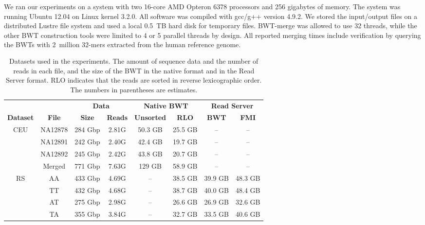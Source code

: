 \documentclass[smallabstract,smallcaptions]{dccpaper}
\newcommand{\BWT}{\textsf{BWT}}
\newcommand{\FMI}{\textsf{FMI}}
\newcommand{\BWTmerge}{\textsf{BWT\nobreakdash-merge}}
\newcommand{\CEU}{\textsf{CEU}}
\newcommand{\RS}{\textsf{RS}}
\begin{document}

We ran our experiments on a system with two 16\nobreakdash-core AMD Opteron 6378 processors and 256 gigabytes of memory. The system was running Ubuntu 12.04 on Linux kernel 3.2.0. All software was compiled with gcc/g++ version 4.9.2. We stored the input/output files on a distributed Lustre file system and used a local 0.5~TB hard disk for temporary files. \BWTmerge{} was allowed to use 32 threads, while the other \BWT{} construction tools were limited to 4 or 5 parallel threads by design. All reported merging times include verification by querying the \BWT{}s with 2~million $32$\nobreakdash-mers extracted from the human reference genome.

\begin{table}[t!]
\begin{center}
\caption{Datasets used in the experiments. The amount of sequence data and the number of reads in each file, and the size of the \BWT{} in the native format and in the Read Server format. RLO indicates that the reads are sorted in reverse lexicographic order. The numbers in parentheses are estimates.}\label{table:datasets}\smallskip%
{
\renewcommand{\baselinestretch}{1}\footnotesize
\begin{tabular}{cc|cc|cc|cc}
\hline
 & & \multicolumn{2}{c|}{\textbf{Data}} & \multicolumn{2}{c|}{\textbf{Native \BWT}} & \multicolumn{2}{c}{\textbf{Read Server}} \\
\textbf{Dataset} & \textbf{File} & \textbf{Size} & \textbf{Reads} & \textbf{Unsorted} & \textbf{RLO} & \textbf{\BWT} & \textbf{\FMI} \\
\hline
\CEU & NA12878 &  284 Gbp & 2.81G & 50.3 GB & 25.5 GB &      -- &       -- \\
     & NA12891 &  242 Gbp & 2.40G & 42.4 GB & 19.7 GB &      -- &       -- \\
     & NA12892 &  245 Gbp & 2.42G & 43.8 GB & 20.7 GB &      -- &       -- \\
     & Merged  &  771 Gbp & 7.63G &  129 GB & 58.9 GB &      -- &       -- \\
\hline
\RS  & AA      &  433 Gbp & 4.69G &      -- & 38.5 GB & 39.9 GB &  48.3 GB \\
     & TT      &  432 Gbp & 4.68G &      -- & 38.7 GB & 40.0 GB &  48.4 GB \\
     & AT      &  275 Gbp & 2.98G &      -- & 26.6 GB & 26.9 GB &  32.6 GB \\
     & TA      &  355 Gbp & 3.84G &      -- & 32.7 GB & 33.5 GB &  40.6 GB \\

\end{tabular}}
\end{center}
\end{table}
\end{document}
